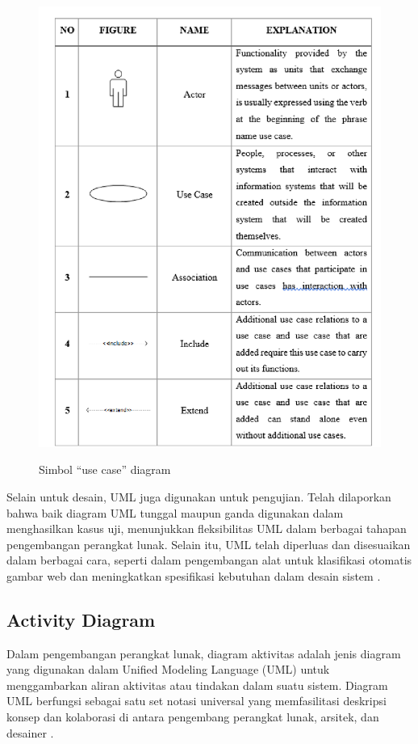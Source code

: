 \begin{figure}[htbp]
  \centering
  \includegraphics[width=0.85\linewidth]{images/bab-2/uc.png}
  \caption{Simbol ``use case'' diagram}\label{fig:use-case-symbols}\citep{ali2019}
\end{figure}

Selain untuk desain, UML juga digunakan untuk pengujian. Telah dilaporkan bahwa baik diagram UML tunggal maupun ganda digunakan dalam menghasilkan kasus uji, menunjukkan fleksibilitas UML dalam berbagai tahapan pengembangan perangkat lunak. Selain itu, UML telah diperluas dan disesuaikan dalam berbagai cara, seperti dalam pengembangan alat untuk klasifikasi otomatis gambar web dan meningkatkan spesifikasi kebutuhan dalam desain sistem \citep{weriza2022development}.

\subsection{Activity Diagram}
Dalam pengembangan perangkat lunak, diagram aktivitas adalah jenis diagram yang digunakan dalam Unified Modeling Language (UML) untuk menggambarkan aliran aktivitas atau tindakan dalam suatu sistem. Diagram UML berfungsi sebagai satu set notasi universal yang memfasilitasi deskripsi konsep dan kolaborasi di antara pengembang perangkat lunak, arsitek, dan desainer \citep{Shcherban2021}.


